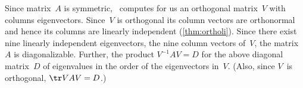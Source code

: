 \begin{example}
\begin{solution}
Since matrix~\(A\) is symmetric, \script\ computes for us an orthogonal matrix~\(V\) with columns eigenvectors.
Since~\(V\) is orthogonal its column vectors are orthonormal and hence its columns are linearly independent (\autoref{thm:ortholi}).
Since there exist nine linearly independent eigenvectors, the nine column vectors of~\(V\), the matrix~\(A\) is diagonalizable.
Further, the product \(V^{-1}AV=D\) for the above diagonal matrix~\(D\) of eigenvalues in the order of the eigenvectors in~\(V\).
(Also, since \(V\)~is orthogonal, \(\tr VAV=D\).)
\end{solution}
\end{example}





